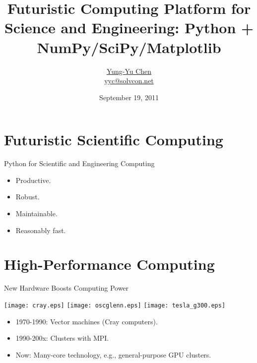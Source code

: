 \documentclass[dvips,xcolor=pst]{beamer}
\title[Futuristic Computing with Python]{Futuristic Computing Platform for
Science and Engineering: Python + NumPy/SciPy/Matplotlib}
\author[\href{http://solvcon.net/yyc/}{Chen}]%
{\href{http://solvcon.net/yyc/}{Yung-Yu Chen} \\ {\scriptsize
\url{yyc@solvcon.net}}}
\institute[\href{http://solvcon.net/}{SOLVCON}]%
{\href{http://solvcon.net/}{SOLVCON Project}}
\date[2011/9/19]{September 19, 2011}
\begin{document}
\begin{frame}
\titlepage
\end{frame}

\section{Futuristic Scientific Computing}

\begin{frame}{
%
Python for Scientific and Engineering Computing
%
}
\begin{itemize}
  \item Productive.
  \item Robust.
  \item Maintainable.
  \item Reasonably fast.
\end{itemize}
\end{frame}

\section{High-Performance Computing}

\begin{frame}{
%
New Hardware Boosts Computing Power
%
}
\begin{center}
  \texttt{[image: cray.eps]}
  \hspace{0.01\textwidth}
  \texttt{[image: oscglenn.eps]}
  \hspace{0.01\textwidth}
  \texttt{[image: tesla\_g300.eps]}
\end{center}
\begin{itemize}
  \item 1970-1990: Vector machines (Cray computers).
  \item 1990-200x: Clusters with MPI.
  \item Now: Many-core technology, e.g., general-purpose GPU clusters.
\end{itemize}
\end{frame}
\end{document}
